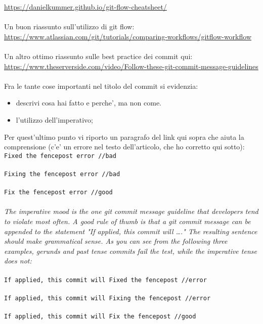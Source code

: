 \url{https://danielkummer.github.io/git-flow-cheatsheet/}\\
\\
Un buon riassunto sull'utilizzo di git flow: \\
\url{https://www.atlassian.com/git/tutorials/comparing-workflows/gitflow-workflow}\\
\\
Un altro ottimo riassunto sulle best practice dei commit qui: \\
\url{https://www.theserverside.com/video/Follow-these-git-commit-message-guidelines}\\
\\
Fra le tante cose importanti nel titolo del commit si evidenzia:
\begin{itemize}
\item descrivi cosa hai fatto e perche', ma non come.
\item l'utilizzo dell'imperativo;
\end{itemize}
Per quest'ultimo punto vi riporto un paragrafo del link qui sopra che aiuta la comprensione (c'e' un errore nel testo dell'articolo, che ho corretto qui sotto):
\\
\texttt{Fixed the fencepost error //bad \\
\\
Fixing the fencepost error //bad \\
\\
Fix the fencepost error //good} \\
\\
\textit{The imperative mood is the one git commit message guideline that developers tend to violate most often. A good rule of thumb is that a git commit message can be appended to the statement "If applied, this commit will …." The resulting sentence should make grammatical sense. As you can see from the following three examples, gerunds and past tense commits fail the test, while the imperative tense does not:}\\
\\
\texttt{If applied, this commit will Fixed the fencepost //error\\
\\
If applied,  this commit will Fixing the fencepost //error\\
\\
If applied,  this commit will Fix the fencepost //good}\\
